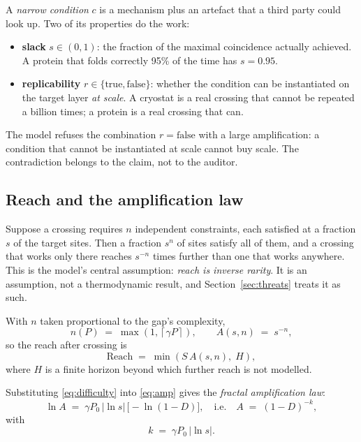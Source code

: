 \documentclass[conference]{IEEEtran}
\theoremstyle{definition}
\begin{document}
A \emph{narrow condition} $c$ is a mechanism plus an artefact that a third party
could look up. Two of its properties do the work:

\begin{itemize}
\item \textbf{slack} $s\in(0,1)$: the fraction of the maximal coincidence actually
achieved. A protein that folds correctly \num{95}\% of the time has $s=0.95$.
\item \textbf{replicability} $r\in\{\text{true},\text{false}\}$: whether the
condition can be instantiated on the target layer \emph{at scale}. A cryostat is
a real crossing that cannot be repeated a billion times; a protein is a real
crossing that can.
\end{itemize}

The model refuses the combination $r=\text{false}$ with a large amplification: a
condition that cannot be instantiated at scale cannot buy scale. The contradiction
belongs to the claim, not to the auditor.

\subsection{Reach and the amplification law}

Suppose a crossing requires $n$ independent constraints, each satisfied at a
fraction $s$ of the target sites. Then a fraction $s^{n}$ of sites satisfy all of
them, and a crossing that works only there reaches $s^{-n}$ times further than one
that works anywhere. This is the model's central assumption: \emph{reach is
inverse rarity}. It is an assumption, not a thermodynamic result, and
Section~\ref{sec:threats} treats it as such.

With $n$ taken proportional to the gap's complexity,
\begin{equation}
n(P) \;=\; \max\!\left(1,\left\lceil \gamma P \right\rceil\right),
\qquad
A(s,n) \;=\; s^{-n},
\label{eq:amp}
\end{equation}
so the reach after crossing is
\begin{equation}
\mathrm{Reach} \;=\; \min\!\left(S\,A(s,n),\; H\right),
\label{eq:reach}
\end{equation}
where $H$ is a finite horizon beyond which further reach is not modelled.

Substituting \eqref{eq:difficulty} into \eqref{eq:amp} gives the
\emph{fractal amplification law}:
\begin{equation}
\ln A \;=\; \gamma P_0\,\lvert\ln s\rvert\,\bigl[-\ln(1-D)\bigr],
\quad\text{i.e.}\quad
A \;=\; (1-D)^{-k},
\label{eq:law}
\end{equation}
with
\begin{equation}
k \;=\; \gamma P_0\,\lvert\ln s\rvert .
\label{eq:k}
\end{equation}
\end{document}
